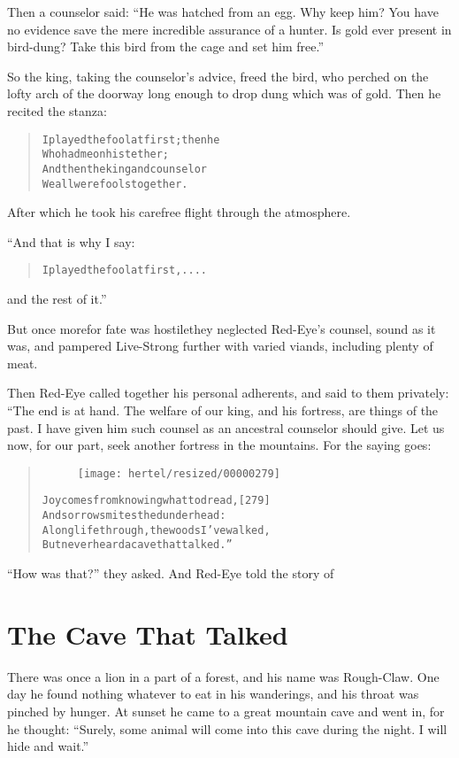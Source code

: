 \documentclass[article, twoside, 10pt]{memoir}
\renewenvironment{verbatim}{%
\begin{quote}%
\vskip -10pt%
\begin{alltt}\normalfont\small}{\end{alltt}%
\end{quote}%
\vskip -10pt
} %
\begin{document}
Then a counselor said:
``He was hatched from an egg. Why keep him? You have no evidence save the mere incredible assurance of a hunter. Is gold ever present in bird-dung? Take this bird from the cage and set him free.''

So the king, taking the counselor's advice, freed the bird, who
perched on the lofty arch of the doorway long enough to drop dung
which was of gold. Then he recited the stanza:

\begin{verbatim}
I played the fool at first; then he
    Who had me on his tether;
And then the king and counselor{\textemdash}
    We all were fools together.
\end{verbatim}
After which he took his carefree flight through the atmosphere.

“And that is why I say:

\begin{verbatim}
I played the fool at first, ....
\end{verbatim}
and the rest of it.”

But once more{\textemdash}for fate was hostile{\textemdash}they neglected Red-Eye's
counsel, sound as it was, and pampered Live-Strong further with
varied viands, including plenty of meat.

Then Red-Eye called together his personal adherents, and said to
them privately: “The end is at hand. The welfare of our king, and
his fortress, are things of the past. I have given him such counsel
as an ancestral counselor should give. Let us now, for our part,
seek another fortress in the mountains. For the saying goes:

\begin{verbatim}
\begin{figure}[p]\texttt{[image: hertel/resized/00000279]}\end{figure}Joy comes from knowing what to dread,                   [279]
And sorrow smites the dunderhead:
A long life through, the woods I've walked,
But never heard a cave that talked.”
\end{verbatim}
``How was that?'' they asked. And Red-Eye told the story of

\chapter{The Cave That Talked}

There was once a lion in a part of a forest, and his name was
Rough-Claw. One day he found nothing whatever to eat in his
wanderings, and his throat was pinched by hunger. At sunset he came
to a great mountain cave and went in, for he thought:
``Surely, some animal will come into this cave during the night. I will hide and wait.''
\end{document}
